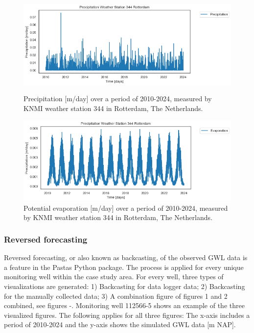 \begin{figure}[htbp]
    \centering
    \begin{minipage}{0.45\textwidth}
        \centering
        \includegraphics[width=\linewidth]{frontmatter/Heijplaat-fig/P.png}
        \caption{Precipitation [m/day] over a period of 2010-2024, measured by KNMI weather station 344 in Rotterdam, The Netherlands. }
        \label{P}
    \end{minipage}\hfill
    \begin{minipage}{0.45\textwidth}
        \centering
        \includegraphics[width=\linewidth]{frontmatter/Heijplaat-fig/ET.png}
        \caption{Potential evaporation [m/day] over a period of 2010-2024, measured by KNMI weather station 344 in Rotterdam, The Netherlands.}
        \label{ET}
    \end{minipage}
\end{figure}

\subsubsection{Reversed forecasting}
Reversed forecasting, or also known as backcasting, of the observed GWL data is a feature in the Pastas Python package. The process is applied for every unique monitoring well within the case study area. For every well, three types of visualizations are generated: 1) Backcasting for data logger data; 2) Backcasting for the manually collected data; 3) A combination figure of figures 1 and 2 combined, see figures -. Monitoring well 112566-5 shows an example of the three visualized figures. The following applies for all three figures: The x-axis includes a period of 2010-2024 and the y-axis shows the simulated GWL data [m NAP].

